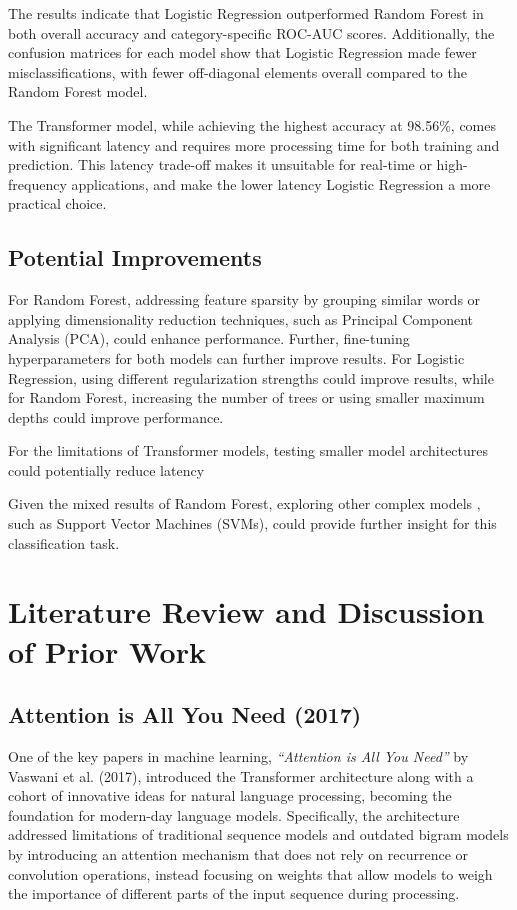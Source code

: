 \documentclass[12pt,letterpaper]{article}
\begin{document}
The results indicate that Logistic Regression outperformed Random Forest in both overall accuracy and category-specific ROC-AUC scores. Additionally, the confusion matrices for each model show that Logistic Regression made fewer misclassifications, with fewer off-diagonal elements overall compared to the Random Forest model.

The Transformer model, while achieving the highest accuracy at 98.56\%, comes with significant latency and requires more processing time for both training and prediction. This latency trade-off makes it unsuitable for real-time or high-frequency applications, and make the lower latency Logistic Regression a more practical choice.


\subsection{Potential Improvements}
For Random Forest, addressing feature sparsity by grouping similar words or applying dimensionality reduction techniques, such as Principal Component Analysis (PCA), could enhance performance. Further, fine-tuning hyperparameters for both models can further improve results. For Logistic Regression, using different regularization strengths could improve results, while for Random Forest, increasing the number of trees or using smaller maximum depths could improve performance.

For the limitations of Transformer models, testing smaller model architectures could potentially reduce latency

Given the mixed results of Random Forest, exploring other complex models , such as Support Vector Machines (SVMs), could provide further insight for this classification task.



\section{Literature Review and Discussion of Prior Work}

\subsection{Attention is All You Need (2017)}

One of the key papers in machine learning, \textit{“Attention is All You Need”} by Vaswani et al. (2017), introduced the Transformer architecture along with a cohort of innovative ideas for natural language processing, becoming the foundation for modern-day language models. Specifically, the architecture addressed limitations of traditional sequence models and outdated bigram models by introducing an attention mechanism that does not rely on recurrence or convolution operations, instead focusing on weights that allow models to weigh the importance of different parts of the input sequence during processing.
\end{document}
